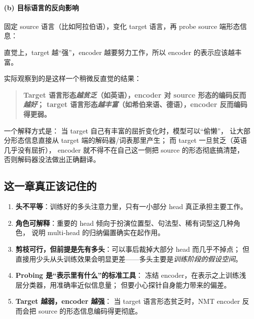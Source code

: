 \paragraph{(b) 目标语言的反向影响}
固定 source 语言（比如阿拉伯语），变化 target 语言，再 probe source 端形态信息：

\begin{intuitionblock}
直觉上，target 越“强”，encoder 越要努力工作，所以 encoder 的表示应该越丰富。
\end{intuitionblock}

实际观察到的是这样一个稍微反直觉的结果：

\begin{quote}
\textbf{Target 语言形态\emph{越贫乏}（如英语），encoder 对 source 形态的编码反而\emph{越好}；
target 语言形态\emph{越丰富}（如希伯来语、德语），encoder 反而编码得更弱。}
\end{quote}

一个解释方式是：
当 target 自己有丰富的屈折变化时，模型可以“偷懒”，
让大部分形态信息直接从 target 端的解码器/词表那里产生；
而 target 一旦贫乏（英语几乎没有屈折），
encoder 就不得不在自己这一侧把 source 的形态彻底搞清楚，
否则解码器没法做出正确翻译。

\subsection{这一章真正该记住的}

\begin{keypointblock}
\begin{enumerate}
  \item \textbf{头不平等}：训练好的多头注意力里，只有一小部分 head 真正承担主要工作。
  \item \textbf{角色可解释}：重要的 head 倾向于扮演位置型、句法型、稀有词型这几种角色，
        说明 multi-head 的归纳偏置确实在起作用。
  \item \textbf{剪枝可行，但前提是先有多头}：可以事后裁掉大部分 head 而几乎不掉点；
        但直接用少头从头训练效果会明显更差——多头主要是\emph{训练阶段的假设空间}。
  \item \textbf{Probing 是“表示里有什么”的标准工具}：
        冻结 encoder，在表示之上训练浅层分类器，用准确率近似信息量；
        但要小心探针自身能力带来的偏差。
  \item \textbf{Target 越弱，encoder 越强}：
        当 target 语言形态贫乏时，NMT encoder 反而会把 source 的形态信息编码得更彻底。
\end{enumerate}
\end{keypointblock}
